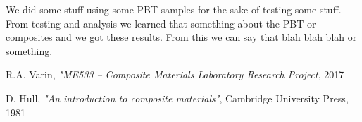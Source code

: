 \documentclass[11pt]{article}
\begin{document}
We did some stuff using some PBT samples for the sake of testing some stuff. From testing and analysis we learned that something about the PBT or composites and we got these results. From this we can say that blah blah blah or something. 

\newpage
\begin{thebibliography}{9}
R.A. Varin, \textit{"ME533 -- Composite Materials Laboratory Research Project}, 2017

D. Hull, \textit{"An introduction to composite materials"}, Cambridge University Press, 1981

\end{thebibliography}
\end{document}

